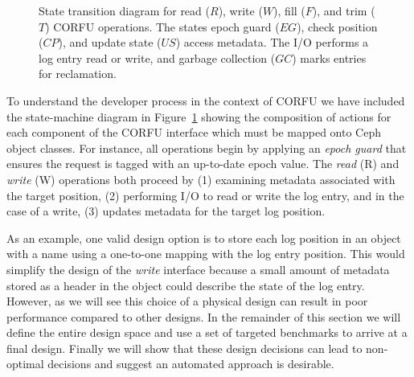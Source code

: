 \documentclass[10pt,twocolumn]{article}
\begin{document}
\begin{figure}[t]
\centering
{}
\caption{State transition diagram for read ($R$), write ($W$), fill ($F$), and
trim ($T$) CORFU operations. The states epoch guard ($EG$), check position ($CP$),
and update state ($US$) access metadata. The I/O performs a log entry read or
write, and garbage collection ($GC$) marks entries for reclamation.}
\label{fig:corfu-sm}
\end{figure}

To understand the developer process in the context of CORFU we have included the
state-machine diagram in Figure~\ref{fig:corfu-sm} showing the composition of
actions for each component of the CORFU interface which must be mapped onto
Ceph object classes. For instance, all operations begin by applying an
\emph{epoch guard} that ensures the request is tagged with an up-to-date epoch
value. The \emph{read} (R) and \emph{write} (W) operations both proceed by (1)
examining metadata associated with the target position, (2) performing I/O to
read or write the log entry, and in the case of a write, (3) updates metadata
for the target log position.

As an example, one valid design option is to store each log position in an
object with a name using a one-to-one mapping with the log entry position.
This would simplify the design of the \emph{write} interface because a small
amount of metadata stored as a header in the object could describe the state
of the log entry.  However, as we will see this choice of a physical design
can result in poor performance compared to other designs. In the remainder of
this section we will define the entire design space and use a set of targeted
benchmarks to arrive at a final design. Finally we will show that these design
decisions can lead to non-optimal decisions and suggest an automated approach
is desirable.
\end{document}
